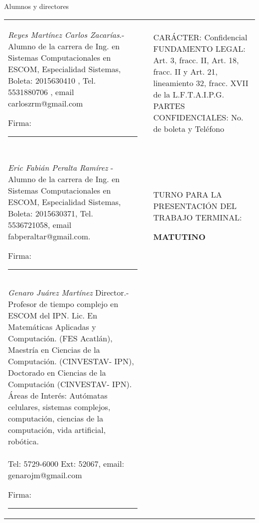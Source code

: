 \documentclass{article}
\begin{document}
    \listoffigures
    \listoftables
    \clearpage
    
    
    
    
    \clearpage
    \newpage
    
    \begin{section}{Alumnos y directores}
        \begin{table}[H]
            \label{my-label}
            \begin{tabular*}{4cm}[]{p{90mm}  p{20mm} >{\columncolor[gray]{0.93}}  p{60mm} }
                \textit{Reyes Martínez Carlos Zacarías}.- Alumno de la carrera de Ing. en Sistemas Computacionales en ESCOM, Especialidad Sistemas, Boleta: 2015630410 , Tel. 5531880706 , email carloszrm@gmail.com
                
                \vspace{10mm}
                Firma:\rule{60mm}{0.1mm}
                &&   
                CARÁCTER: Confidencial
                FUNDAMENTO LEGAL: Art. 3, fracc. II, Art. 18, fracc. II y Art. 21, lineamiento 32, fracc. XVII de la L.F.T.A.I.P.G.
                PARTES CONFIDENCIALES: No. de boleta y Teléfono
                
                \\
                \\
                \\
                
                \textit{Eric Fabián Peralta Ramírez }- Alumno de la carrera de Ing. en Sistemas Computacionales en ESCOM, Especialidad Sistemas, Boleta: 2015630371, Tel. 5536721058, email fabperaltar@gmail.com.
                
                \vspace{10mm}
                Firma:\rule{60mm}{0.1mm}
                && 
                TURNO PARA LA PRESENTACIÓN DEL TRABAJO TERMINAL:
                
                \textbf{MATUTINO}
                
                \\
                \\
                \\

                \textit{Genaro Juárez Martínez} Director.- 
               Profesor de tiempo complejo en ESCOM del IPN. Lic. En Matemáticas Aplicadas y Computación. (FES Acatlán), Maestría en Ciencias de la Computación. (CINVESTAV- IPN), Doctorado en Ciencias de la Computación (CINVESTAV- IPN). Áreas de Interés: Autómatas celulares, sistemas complejos, computación, ciencias de la computación, vida artificial, robótica. \\Tel: 5729-6000 Ext: 52067, email: genarojm@gmail.com

                
                \vspace{10mm}
                Firma:\rule{60mm}{0.1mm}
                & 
            \end{tabular*}
        \end{table}
    \end{section}
\end{document}
